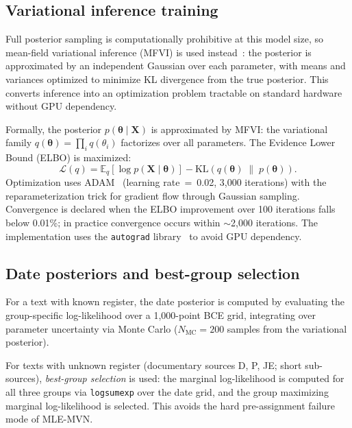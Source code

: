 \documentclass[10pt,letterpaper]{article}
\newcommand{\mvn}{MLE-MVN}
\begin{document}
\subsection*{Variational inference training}

Full posterior sampling is computationally prohibitive at this model size,
so mean-field variational inference (MFVI) is used instead~\cite{Jordan1999,Ranganath2014}: the posterior
is approximated by an independent Gaussian over each parameter, with means
and variances optimized to minimize KL divergence from the true posterior.
This converts inference into an optimization problem tractable on standard
hardware without GPU dependency.

Formally, the posterior $p(\boldsymbol{\theta} \mid \mathbf{X})$ is approximated
by MFVI: the variational family
$q(\boldsymbol{\theta}) = \prod_i q(\theta_i)$ factorizes over all
parameters.  The Evidence Lower Bound (ELBO) is maximized:
%
\begin{equation}
  \mathcal{L}(q) =
    \mathbb{E}_q\!\left[\log p(\mathbf{X} \mid \boldsymbol{\theta})\right]
    - \mathrm{KL}\!\left(q(\boldsymbol{\theta}) \;\|\; p(\boldsymbol{\theta})\right).
  \label{eq:elbo}
\end{equation}
%
Optimization uses ADAM~\cite{Kingma2014} (learning rate~=~0.02,
3{,}000 iterations) with the reparameterization trick for gradient flow
through Gaussian sampling.  Convergence is declared when the ELBO improvement
over 100 iterations falls below 0.01\%; in practice convergence occurs
within $\sim$2{,}000 iterations.  The implementation uses the
\texttt{autograd} library~\cite{Maclaurin2015} to avoid GPU dependency.

\subsection*{Date posteriors and best-group selection}

For a text with known register, the date posterior is computed by
evaluating the group-specific log-likelihood over a 1{,}000-point BCE grid,
integrating over parameter uncertainty via Monte Carlo ($N_{\text{MC}} = 200$
samples from the variational posterior).

For texts with unknown register (documentary sources D, P, JE; short
sub-sources), \emph{best-group selection} is used: the marginal
log-likelihood is computed for all three groups via \texttt{logsumexp}
over the date grid, and the group maximizing marginal log-likelihood is
selected.  This avoids the hard pre-assignment failure mode of \mvn{}.
\end{document}
